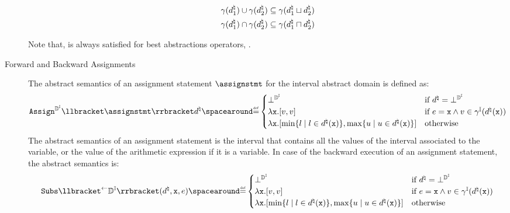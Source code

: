 \begin{description}
\begin{definition}
  \begin{align*}
    \gamma(d^\natural_1) \cup \gamma(d^\natural_2) &\subseteq \gamma(d^\natural_1 \sqcup d^\natural_2) \\
    \gamma(d^\natural_1) \cap \gamma(d^\natural_2) &\subseteq \gamma(d^\natural_1 \sqcap d^\natural_2)
  \end{align*}
  \end{definition}
  Note that,  is always satisfied for best abstractions operators, \cf{} .
  \item[Forward and Backward Assignments]
  The abstract semantics of an assignment statement $\assignstmt$ for the interval abstract domain is defined as:
  \begin{align*}
    \intervalabstractdomainassign \semanticsof{\assignstmt}\defabstractvalue
    \DefeQ \begin{cases}
      \intervalabstractdomainbottom & \text{if } \defabstractvalue = \intervalabstractdomainbottom \\
      \lambda \defvariable.\interval{\defvalue}{\defvalue} & \text{if } \defaexp = \defvariable \land \defvalue \in \intervalconcretization(\defabstractvalue(\defvariable)) \\
      \lambda \defvariable.\interval{\min\setdef{l}{l\in\defabstractvalue(\defvariable)}}{\max\setdef{u}{u\in\defabstractvalue(\defvariable)}} & \text{otherwise}
    \end{cases}
  \end{align*}
  The abstract semantics of an assignment statement is the interval that contains all the values of the interval associated to the variable, or the value of the arithmetic expression if it is a variable.
  In case of the backward execution of an assignment statement, the abstract semantics is:
  \begin{align*}
    \intervalabstractdomainsubstitute(\defabstractvalue, \defvariable, \defaexp) \DefeQ \begin{cases}
      \intervalabstractdomainbottom & \text{if } \defabstractvalue = \intervalabstractdomainbottom \\
      \lambda \defvariable.\interval{\defvalue}{\defvalue} & \text{if } \defaexp = \defvariable \land \defvalue \in \intervalconcretization(\defabstractvalue(\defvariable)) \\
      \lambda \defvariable.\interval{\min\setdef{l}{l\in\defabstractvalue(\defvariable)}}{\max\setdef{u}{u\in\defabstractvalue(\defvariable)}} & \text{otherwise}

\end{cases}
\end{align*}
\end{description}
